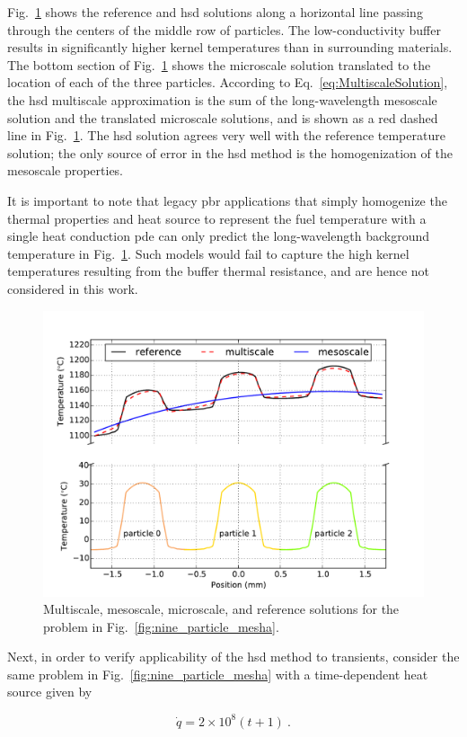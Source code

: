 Fig.\ \ref{fig:MMD_example} shows the reference and \gls{hsd} solutions along a horizontal line passing through the centers of the middle row of particles. The low-conductivity buffer results in significantly higher kernel temperatures than in surrounding materials. The bottom section of Fig.\ \ref{fig:MMD_example} shows the microscale solution translated to the location of each of the three particles. According to Eq.\ \eqref{eq:MultiscaleSolution}, the \gls{hsd} multiscale approximation is the sum of the long-wavelength mesoscale solution and the translated microscale solutions, and is shown as a red dashed line in Fig.\ \ref{fig:MMD_example}. The \gls{hsd} solution agrees very well with the reference temperature solution; the only source of error in the \gls{hsd} method is the homogenization of the mesoscale properties.

It is important to note that legacy \gls{pbr} applications that simply homogenize the thermal properties and heat source to represent the fuel temperature with a single heat conduction \gls{pde} can only predict the long-wavelength background temperature in Fig.\ \ref{fig:MMD_example}. Such models would fail to capture the high kernel temperatures resulting from the buffer thermal resistance, and are hence not considered in this work.

\begin{figure}[!h]
\centering
\includegraphics[width=0.6\linewidth]{figs/nine_center_row_multiscale.png}
\caption{Multiscale, mesoscale, microscale, and reference solutions for the problem in Fig.\ \ref{fig:nine_particle_mesha}.}
\label{fig:MMD_example}
\end{figure}

Next, in order to verify applicability of the \gls{hsd} method to transients, consider the same problem in Fig.\ \ref{fig:nine_particle_mesha} with a time-dependent heat source given by

\begin{equation}
\label{eq:time_q}
\dot{q}=2\times10^8(t+1)\ .
\end{equation}

